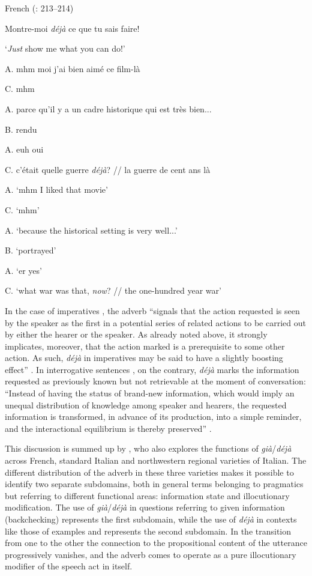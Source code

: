 \ea%
    \label{ex:key:100}

          French (\citealt{Hansen2008}: 213–214)

 \ea \label{ex:key:100a} Montre-moi \textit{déjà} ce que tu sais faire!

\glt ‘\textit{Just} show me what you can do!’

\ex \label{ex:key:100b} A.   mhm moi j’ai bien aimé ce film-là

C.   mhm

A.   parce qu’il y a un cadre historique qui est très bien...

B.   rendu

A.   euh oui

C.   c’était quelle guerre \textit{déjà}? // la guerre de cent ans là

\glt

A.   ‘mhm I liked that movie’

C.   ‘mhm’

A.   ‘because the historical setting is very well...’

B.   ‘portrayed’

A.   ‘er yes’

C.   ‘what war was that, \textit{now}? // the one-hundred year war’
    \z
\z

In the case of imperatives , the adverb “signals that the action requested is seen by the speaker as the first in a potential series of related actions to be carried out by either the hearer or the speaker. As already noted above, it strongly implicates, moreover, that the action marked is a prerequisite to some other action. As such, \textit{déjà} in imperatives may be said to have a slightly boosting effect” \citep[215]{Hansen2008}. In interrogative sentences , on the contrary, \textit{déjà} marks the information requested as previously known but not retrievable at the moment of conversation: “Instead of having the status of brand-new information, which would imply an unequal distribution of knowledge among speaker and hearers, the requested information is transformed, in advance of its production, into a simple reminder, and the interactional equilibrium is thereby preserved” \citep[213--214]{Hansen2008}.

This discussion is summed up by \citet[192–197]{Squartini2014}, who also explores the functions of \textit{già}/\textit{déjà} across French, standard Italian and northwestern regional varieties of Italian. The different distribution of the adverb in these three varieties makes it possible to identify two separate subdomains, both in general terms belonging to pragmatics but referring to different functional areas: information state and illocutionary modification. The use of \textit{già}/\textit{déjà} in questions referring to given information (backchecking) represents the first subdomain, while the use of \textit{déjà} in contexts like those of examples  and  represents the second subdomain. In the transition from one to the other the connection to the propositional content of the utterance progressively vanishes, and the adverb comes to operate as a pure illocutionary modifier of the speech act in itself.

